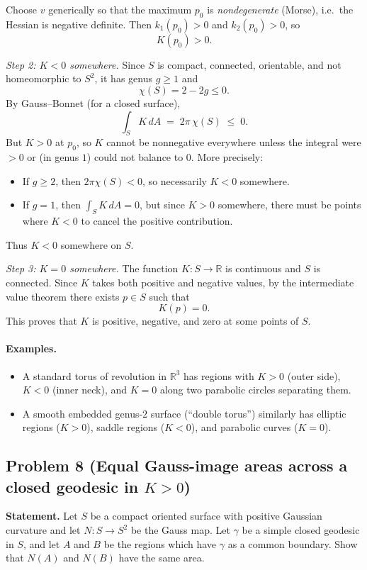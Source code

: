 \documentclass[12pt,a4paper]{article}
\theoremstyle{plain}
\theoremstyle{definition}      %
\begin{document}
	Choose $v$ generically so that the maximum $p_0$ is \emph{nondegenerate} (Morse), i.e.\ the Hessian is negative definite.
	Then $k_1(p_0)>0$ and $k_2(p_0)>0$, so
	\[
	K(p_0)>0.
	\]
	
	\textit{Step 2: $K<0$ somewhere.}
	Since $S$ is compact, connected, orientable, and not homeomorphic to $S^2$, it has genus $g\ge 1$ and
	\[
	\chi(S)=2-2g\le 0.
	\]
	By Gauss--Bonnet (for a closed surface),
	\[
	\int_S K\,dA \;=\; 2\pi\,\chi(S)\;\le\;0.
	\]
	But $K>0$ at $p_0$, so $K$ cannot be nonnegative everywhere unless the integral were $>0$ or (in genus $1$) could not balance to $0$.
	More precisely:
	\begin{itemize}
		\item If $g\ge 2$, then $2\pi\chi(S)<0$, so necessarily $K<0$ somewhere.
		\item If $g=1$, then $\int_S K\,dA=0$, but since $K>0$ somewhere, there must be points where $K<0$ to cancel the positive contribution.
	\end{itemize}
	Thus $K<0$ somewhere on $S$.
	
	\textit{Step 3: $K=0$ somewhere.}
	The function $K:S\to\mathbb{R}$ is continuous and $S$ is connected.
	Since $K$ takes both positive and negative values, by the intermediate value theorem there exists $p\in S$ such that
	\[
	K(p)=0.
	\]
	This proves that $K$ is positive, negative, and zero at some points of $S$.
	
	\paragraph{Examples.}
	\begin{itemize}
		\item A standard torus of revolution in $\mathbb{R}^3$ has regions with $K>0$ (outer side), $K<0$ (inner neck),
		and $K=0$ along two parabolic circles separating them.
		\item A smooth embedded genus-$2$ surface (“double torus”) similarly has elliptic regions ($K>0$), saddle regions ($K<0$),
		and parabolic curves ($K=0$).
	\end{itemize}
	
	
	
	\subsection*{Problem 8 (Equal Gauss-image areas across a closed geodesic in $K>0$)}
	
	\textbf{Statement.}
	Let $S$ be a compact oriented surface with positive Gaussian curvature and let $N:S\to S^2$ be the Gauss map.
	Let $\gamma$ be a simple closed geodesic in $S$, and let $A$ and $B$ be the regions which have $\gamma$ as a common boundary.
	Show that $N(A)$ and $N(B)$ have the same area.
	
\end{document}
